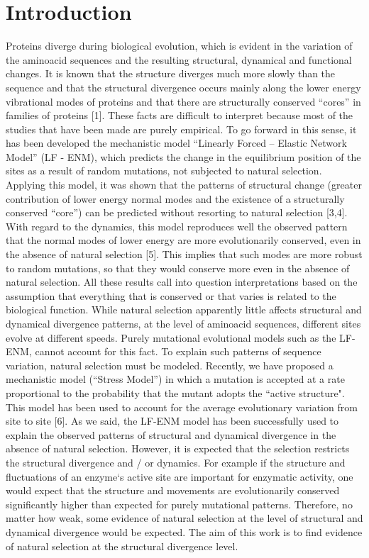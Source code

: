\documentclass{article}
\begin{document}
\section{Introduction}
Proteins diverge during biological evolution, which is evident in the variation of the aminoacid sequences and the resulting structural, dynamical and functional changes. It is known that the structure diverges much more slowly than the sequence and that the  structural divergence occurs mainly along the lower energy vibrational modes of proteins and that there are structurally conserved ``cores'' in families of proteins [1]. These facts are difficult to interpret because most of the studies that have been made are purely empirical. To go forward in this sense, it has been developed the mechanistic model ``Linearly Forced – Elastic Network Model'' (LF - ENM), which predicts the change in the equilibrium position of the sites as a result of random mutations, not subjected to natural selection. Applying this model, it was shown that the patterns of structural change (greater contribution of lower energy normal modes and the existence of a structurally conserved ``core'') can be predicted without resorting to natural selection [3,4]. With regard to the dynamics, this model reproduces well the observed pattern that the normal modes of lower energy are more evolutionarily conserved, even in the absence of natural selection [5]. This implies that such modes are more robust to random mutations, so that they would conserve more even in the absence of natural selection. All these results call into question interpretations based on the assumption that everything that is conserved or that varies is related to the biological function.
While natural selection apparently little affects structural and dynamical divergence patterns, at the level of aminoacid sequences, different sites evolve at different speeds. Purely mutational evolutional models such as the LF-ENM, cannot account for this fact. To explain such patterns of sequence variation, natural selection must be modeled. Recently, we have proposed a mechanistic model (``Stress Model'') in which a mutation is accepted at a rate proportional to the probability that the mutant adopts the ``active structure". This model has been used to account for the average evolutionary variation from site to site [6].
As we said, the LF-ENM model has been successfully used to explain the observed patterns of structural and dynamical divergence in the absence of natural selection. However, it is expected that the selection restricts the structural divergence and / or dynamics. For example if the structure and fluctuations of an enzyme`s active site are important for enzymatic activity, one would expect that the structure and movements are evolutionarily conserved significantly higher than expected for purely mutational patterns. Therefore, no matter how weak, some evidence of natural selection at the level of structural and dynamical divergence would be expected. The aim of this work is to find evidence of natural selection at the structural divergence level.
\end{document}

